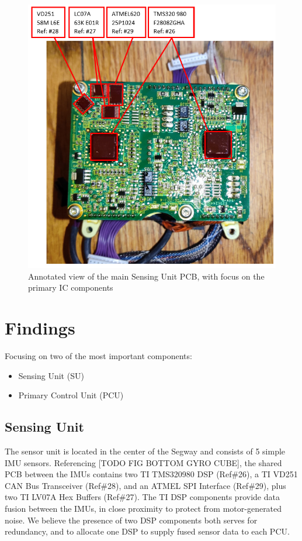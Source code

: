 \documentclass[]{formalLabReport}
\begin{document}
\begin{figure}
    \includegraphics[]{annotatedGyroCubeBottom.png}
    \caption{Annotated view of the main Sensing Unit PCB, with focus on the primary IC components}
    \label{fig:annotatedGyroCubeBottom.jpg}
\end{figure}

\section{Findings}
Focusing on two of the most important components:
\begin{itemize}
    \item Sensing Unit (SU)
    \item Primary Control Unit (PCU)
\end{itemize}

\subsection{Sensing Unit}
The sensor unit is located in the center of the Segway and consists of 5 simple IMU sensors. Referencing [TODO FIG BOTTOM GYRO CUBE], the shared PCB between the IMUs contains two TI TMS320980 DSP (Ref\#26), a TI VD251 CAN Bus Transceiver (Ref\#28), and an ATMEL SPI Interface (Ref\#29), plus two TI LV07A Hex Buffers (Ref\#27). The TI DSP components provide data fusion between the IMUs, in close proximity to protect from motor-generated noise. We believe the presence of two DSP components both serves for redundancy, and to allocate one DSP to supply fused sensor data to each PCU.
\end{document}
